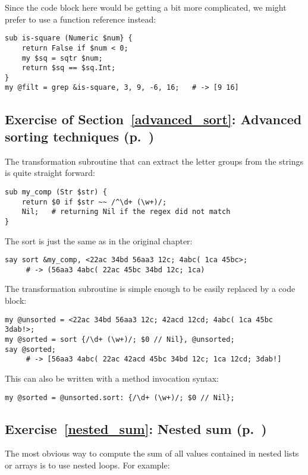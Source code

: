 Since the code block here would be getting a bit more 
complicated, we might prefer to use a function 
reference instead:

\begin{verbatim}
sub is-square (Numeric $num} { 
    return False if $num < 0;
    my $sq = sqtr $num;
    return $sq == $sq.Int;
} 
my @filt = grep &is-square, 3, 9, -6, 16;   # -> [9 16]
\end{verbatim}
%
\subsection{Exercise of Section~\ref{advanced_sort}: Advanced sorting techniques (p.~\pageref{sort_exercise})}
\label{sol_sort_exercise}

The transformation subroutine that can extract the letter 
groups from the strings is quite straight forward:

\begin{verbatim}
sub my_comp (Str $str) {
    return $0 if $str ~~ /^\d+ (\w+)/; 
    Nil;   # returning Nil if the regex did not match
}
\end{verbatim}
%
The sort is just the same as in the original chapter:
\begin{verbatim}
say sort &my_comp, <22ac 34bd 56aa3 12c; 4abc( 1ca 45bc>;
     # -> (56aa3 4abc( 22ac 45bc 34bd 12c; 1ca)
\end{verbatim}

The transformation subroutine is simple enough to be easily 
replaced by a code block:

\begin{verbatim}
my @unsorted = <22ac 34bd 56aa3 12c; 42acd 12cd; 4abc( 1ca 45bc 3dab!>;
my @sorted = sort {/\d+ (\w+)/; $0 // Nil}, @unsorted;
say @sorted; 
     # -> [56aa3 4abc( 22ac 42acd 45bc 34bd 12c; 1ca 12cd; 3dab!]
\end{verbatim}
%
This can also be written with a method invocation syntax:
\begin{verbatim}
my @sorted = @unsorted.sort: {/\d+ (\w+)/; $0 // Nil};
\end{verbatim}
%

\subsection{Exercise~\ref{nested_sum}: Nested sum (p.~\pageref{nested_sum})}
\label{sol_nested_sum}

The most obvious way to compute the sum of all values contained 
in nested lists or arrays is to use nested loops. For example:

